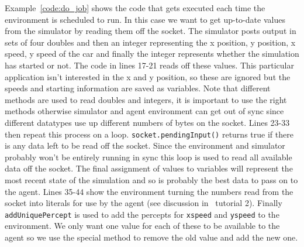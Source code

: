 Example~\ref{code:do_job} shows the code that gets executed each time the environment is scheduled to run.  In this case we want to get up-to-date values from the simulator by reading them off the socket.  The simulator posts output in sets of four doubles and then an integer representing the x position, y position, x speed, y speed of the car and finally the integer represents whether the simulation has started or not.  The code in lines 17-21 reads off these values.  This particular application isn't interested in the x and y position, so these are ignored but the speeds and starting information are saved as variables.  Note that different methods are used to read doubles and integers, it is important to use the right methods otherwise simulator and agent environment can get out of sync since different datatypes use up different numbers of bytes on the socket.  Lines 23-33 then repeat this process on a loop.  \texttt{socket.pendingInput()} returns true if there is any data left to be read off the socket.  Since the environment and simulator probably won't be entirely running in sync this loop is used to read all available data off the socket.  The final assignment of values to variables will represent the most recent state of the simulation and so is probably the best data to pass on to the agent.  Lines 35-44 show the environment turning the numbers read from the socket into literals for use by the agent (see discussion in \ail\ tutorial 2).  Finally \texttt{addUniquePercept} is used to add the percepts for \texttt{xspeed} and \texttt{yspeed} to the environment.  We only want one value for each of these to be available to the agent so we use the special method to remove the old value and add the new one.

